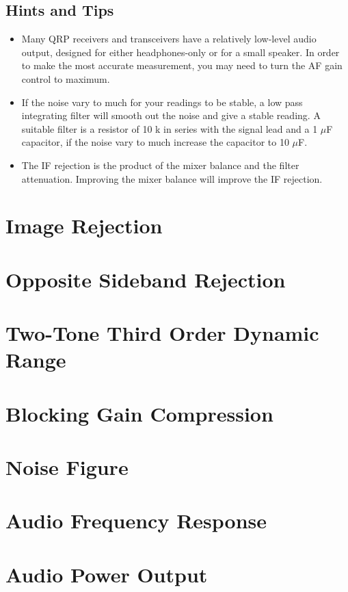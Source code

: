 \documentclass[10pt,letterpaper]{book}
\begin{document}
\subsection*{Hints and Tips}
\begin{itemize}
	\item Many QRP receivers and transceivers have a relatively low-level audio output, designed for either headphones-only or for a small speaker. In order to make the most accurate measurement, you may need to turn the AF gain control to maximum.
	\item If the noise vary to much for your readings to be stable, a low pass integrating filter will smooth out the noise and give a stable reading. A suitable filter is a resistor of 10 k in series with the signal lead and a 1 $\mu$F capacitor, if the noise vary to much increase the capacitor to 10 $\mu$F.  
	\item The IF rejection is the product of the mixer balance and the filter attenuation. Improving the mixer balance will improve the IF rejection.
\end{itemize}





\section{Image Rejection}
\section{Opposite Sideband Rejection}
\section{Two-Tone Third Order Dynamic Range}
\section{Blocking Gain Compression}
\section{Noise Figure}
\section{Audio Frequency Response}
\section{Audio Power Output}
\end{document}
